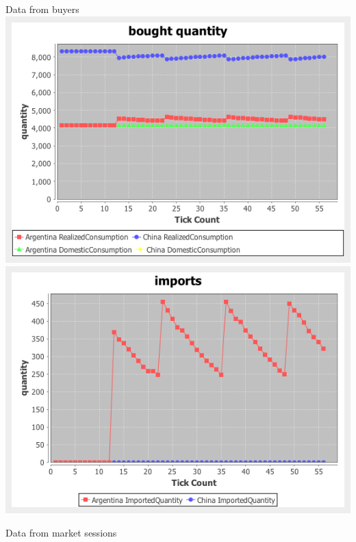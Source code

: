 \documentclass{article}
\begin{document}
\noindent Data from buyers
\vskip2mm
\hskip-2cm
\includegraphics[scale=0.4]{fig_case4_qs}
\includegraphics[scale=0.4]{fig_case4_imports}

\noindent Data from market sessions
\end{document}
